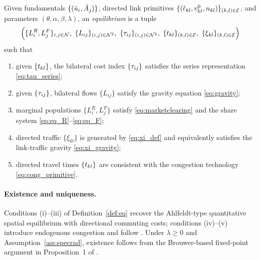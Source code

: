 \begin{definition}[Equilibrium]\label{def:eq}
Given fundamentals $\{(\bar u_i,\bar A_j)\}$, directed link primitives
$\{(\ell_{kl},v^{0}_{kl},n_{kl})\}_{(k,l)\in\mathcal E}$, and parameters
$(\theta,\alpha,\beta,\lambda)$, an \emph{equilibrium} is a tuple
\[
  \Bigl(\{L_i^R,L_j^F\}_{i,j\in\N},\ \{L_{ij}\}_{(i,j)\in\N^2},\
  \{\tijk\}_{(i,j)\in\N^2},\ \{\tkl\}_{(k,l)\in\E},\
  \{\xi_{kl}\}_{(k,l)\in\E}\Bigr)
\]
such that
\begin{enumerate}[label=(\roman*),leftmargin=2em,itemsep=0.2em]
\item given $\{t_{kl}\}$, the bilateral cost index $\{\tau_{ij}\}$ satisfies
  the series representation \eqref{eq:tau_series};
\item given $\{\tau_{ij}\}$, bilateral flows $\{L_{ij}\}$ satisfy the
  gravity equation \eqref{eq:gravity};
\item marginal populations $\{L_i^R,L_j^F\}$ satisfy
  \eqref{eq:marketclearing} and the share system
  \eqref{eq:eq_R}--\eqref{eq:eq_F};
\item directed traffic $\{\xi_{kl}\}$ is generated by
  \eqref{eq:xi_def} and equivalently satisfies the link-traffic gravity
  \eqref{eq:xi_gravity};
\item directed travel times $\{t_{kl}\}$ are consistent with the
  congestion technology \eqref{eq:cong_primitive}.
\end{enumerate}
\end{definition}

\paragraph{Existence and uniqueness.}
Conditions (i)--(iii) of Definition~\ref{def:eq} recover the
Ahlfeldt-type quantitative spatial equilibrium with directional
commuting costs; conditions (iv)--(v) introduce endogenous congestion
and follow \cite{AllenArkolakis2022}.  Under $\lambda\ge 0$ and
Assumption~\ref{ass:specrad}, existence follows from the
Brouwer-based fixed-point argument in Proposition~1 of
\cite{AllenArkolakis2022}.

